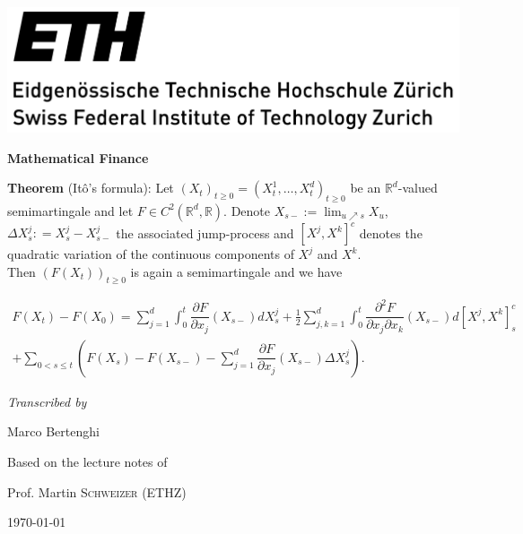 \documentclass[12pt,a4paper, twoside]{article}
\author{Marco Bertenghi}
\date{}
\theoremstyle{definition}
\begin{document}
\begin{titlepage}
	\centering
	
	{\scshape \includegraphics[scale=.4]{ETHZ_Logo.pdf} \par}

	\vspace{1cm}
	{\huge\bfseries Mathematical Finance\par}
		\vspace{1cm}
		\begin{mdframed}[backgroundcolor=blue!20, topline=true, linewidth=2.0pt]
\begin{flushleft}\textbf{Theorem} (Itô's formula): Let $(X_t)_{t \geq 0} = (X_t^1, \dots , X_t^d)_{t \geq 0}$ be an $\mathbb{R}^d$-valued semimartingale and let $F \in C^2 ( \mathbb{R}^d, \mathbb{R})$.  Denote $X_{s-}:= \lim_{u \nearrow s} X_u$, $\Delta X_s^j: = X_s^j-X_{s-}^j$ the associated jump-process and $[ X^j, X^k]^c$ denotes the quadratic variation of the continuous components of $X^j$ and $X^k$. \\ Then $(F(X_t))_{t \geq 0}$ is again a semimartingale and we have
\end{flushleft}
\begin{align*}
F(X_t)-F(X_0)= \sum_{j=1}^d \int_0^t \dfrac{\partial F}{\partial x_j} (X_{s-}) dX_s^j + \frac{1}{2} \sum_{j,k=1}^d \int_0^t \dfrac{\partial^2  F}{\partial x_j \partial x_k}(X_{s-}) d [ X^j, X^k ]_s^c \\
+ \sum_{0 < s \leq t} \left( F(X_s)-F(X_{s-}) - \sum_{j=1}^d \dfrac{\partial F}{\partial x_j} (X_{s-}) \Delta X_s^j \right). 
\end{align*}
\end{mdframed}
\par\vspace{1cm}
	\vspace{2cm}
	{\Large\itshape Transcribed by \par Marco Bertenghi\par}
	\vfill
	Based on the lecture notes of \par
	Prof. Martin \textsc{Schweizer} (ETHZ)

	\vfill

	{\large \today\par}
\end{titlepage}
\end{document}
